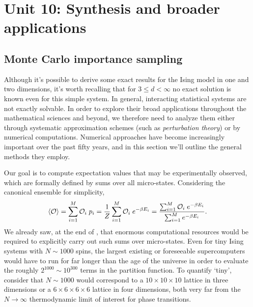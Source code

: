 \renewcommand{\thisunit}{MATH327 Unit 10}
\renewcommand{\moddate}{Last modified 22 Jan.~2024}
\setcounter{section}{10}
\setcounter{subsection}{0}
{}
\section*{Unit 10: Synthesis and broader applications} %
\subsection{\label{sec:MonteCarlo}Monte Carlo importance sampling}
Although it's possible to derive some exact results for the Ising model in one and two dimensions, it's worth recalling that for $3 \leq d < \infty$ no exact solution is known even for this simple system.
In general, interacting statistical systems are not exactly solvable.
In order to explore their broad applications throughout the mathematical sciences and beyond, we therefore need to analyze them either through systematic approximation schemes (such as \emph{perturbation theory}) or by numerical computations.
Numerical approaches have become increasingly important over the past fifty years, and in this section we'll outline the general methods they employ.

Our goal is to compute expectation values that may be experimentally observed, which are formally defined by sums over all micro-states.
Considering the canonical ensemble for simplicity,
\begin{equation*}
  \left\langle \mathcal O \right\rangle = \sum_{i = 1}^M \mathcal O_i \; p_i = \frac{1}{Z} \sum_{i = 1}^M \mathcal O_i \; e^{-\beta E_i} = \frac{\sum_{i = 1}^M \mathcal O_i \; e^{-\beta E_i}}{\sum_{i = 1}^M e^{-\beta E_i}}.
\end{equation*}
We already saw, at the end of , that enormous computational resources would be required to explicitly carry out such sums over micro-states.
Even for tiny Ising systems with $N \sim 1000$ spins, the largest existing or foreseeable supercomputers would have to run for far longer than the age of the universe in order to evaluate the roughly $2^{1000} \sim 10^{300}$ terms in the partition function.
To quantify `tiny', consider that $N \sim 1000$ would correspond to a $10\times 10\times 10$ lattice in three dimensions or a $6\times 6\times 6\times 6$ lattice in four dimensions, both very far from the $N \to \infty$ thermodynamic limit of interest for phase transitions.

